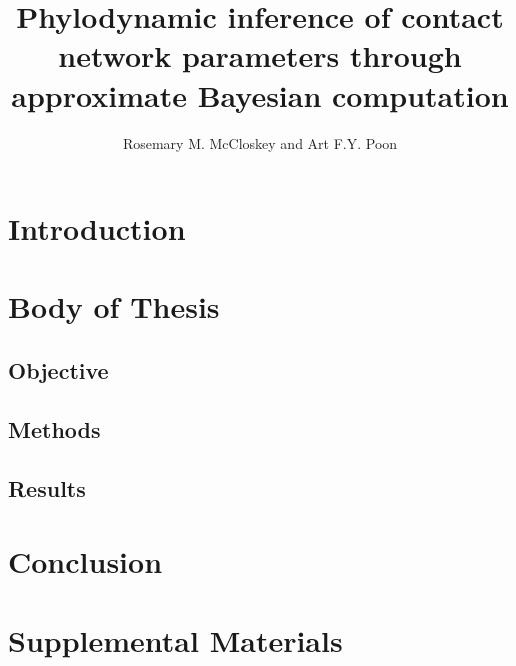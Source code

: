 \documentclass[12pt]{report}
\title{Phylodynamic inference of contact network parameters through approximate
Bayesian computation}
\author{Rosemary M. McCloskey and Art F.Y. Poon}
\begin{document}
\maketitle

\tableofcontents

\listoffigures

\printglossary[title=List of Symbols]
\printglossary[title=List of Abbreviations,type=\acronymtype]

\chapter{Introduction}


\chapter{Body of Thesis}

\section{Objective}


\section{Methods}


\section{Results}


\chapter{Conclusion}

\printbibliography

\chapter{Supplemental Materials}

\setcounter{table}{0}
\renewcommand{\thetable}{S\arabic{table}}
\setcounter{figure}{0}
\renewcommand{\thefigure}{S\arabic{figure}}

\end{document}
